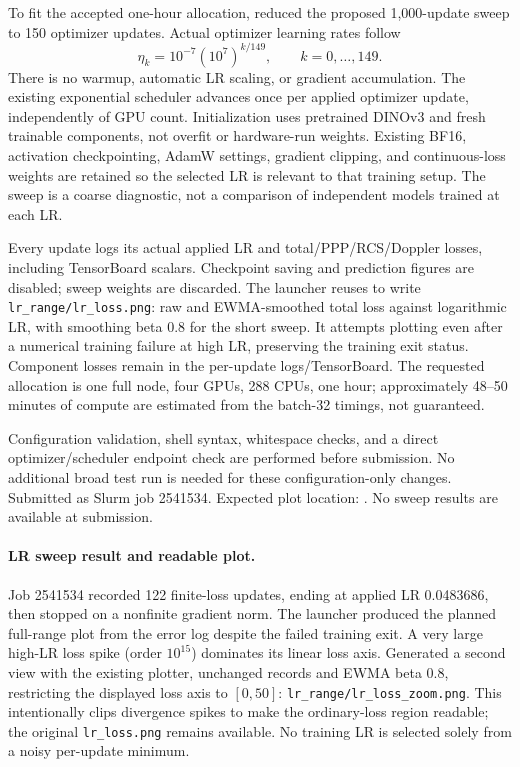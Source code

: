 \documentclass[11pt,a4paper]{article}
\begin{document}
To fit the accepted one-hour allocation, reduced the proposed 1,000-update sweep to 150 optimizer updates. Actual optimizer learning rates follow
\[
\eta_k=10^{-7}(10^7)^{k/149},\qquad k=0,\ldots,149.
\]
There is no warmup, automatic LR scaling, or gradient accumulation. The existing exponential scheduler advances once per applied optimizer update, independently of GPU count. Initialization uses pretrained DINOv3 and fresh trainable components, not overfit or hardware-run weights. Existing BF16, activation checkpointing, AdamW settings, gradient clipping, and continuous-loss weights are retained so the selected LR is relevant to that training setup. The sweep is a coarse diagnostic, not a comparison of independent models trained at each LR.

Every update logs its actual applied LR and total/PPP/RCS/Doppler losses, including TensorBoard scalars. Checkpoint saving and prediction figures are disabled; sweep weights are discarded. The launcher reuses  to write \texttt{lr\_range/lr\_loss.png}: raw and EWMA-smoothed total loss against logarithmic LR, with smoothing beta 0.8 for the short sweep. It attempts plotting even after a numerical training failure at high LR, preserving the training exit status. Component losses remain in the per-update logs/TensorBoard. The requested allocation is one full node, four GPUs, 288 CPUs, one hour; approximately 48--50 minutes of compute are estimated from the batch-32 timings, not guaranteed.

Configuration validation, shell syntax, whitespace checks, and a direct optimizer/scheduler endpoint check are performed before submission. No additional broad test run is needed for these configuration-only changes. Submitted as Slurm job 2541534. Expected plot location: . No sweep results are available at submission.

\paragraph{LR sweep result and readable plot.}
Job 2541534 recorded 122 finite-loss updates, ending at applied LR 0.0483686, then stopped on a nonfinite gradient norm. The launcher produced the planned full-range plot from the error log despite the failed training exit. A very large high-LR loss spike (order $10^{15}$) dominates its linear loss axis. Generated a second view with the existing plotter, unchanged records and EWMA beta 0.8, restricting the displayed loss axis to $[0,50]$: \texttt{lr\_range/lr\_loss\_zoom.png}. This intentionally clips divergence spikes to make the ordinary-loss region readable; the original \texttt{lr\_loss.png} remains available. No training LR is selected solely from a noisy per-update minimum.
\end{document}
